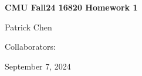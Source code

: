 \documentclass[12pt]{article}
\begin{document}
	\begin{titlepage}
    	\vspace*{\fill} %
    	\begin{center}
        	{\huge \textbf{CMU Fall24 16820 Homework 1} \par}
       		\vspace{0.5cm}
        		{\large Patrick Chen \par}
        		\vspace{0.5cm}
		{\large Collaborators: \par}
		\vspace{0.5cm}
        		{\large September 7, 2024 \par}
    	\end{center}
    	\vspace*{\fill} %
	\end{titlepage}
	
	\newpage
\end{document}
